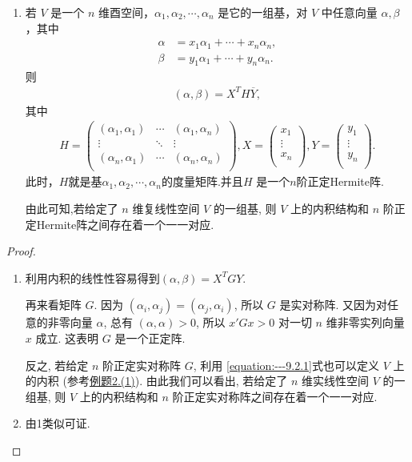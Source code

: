 \documentclass[../../main.tex]{subfiles}%
\begin{document}
\begin{theorem}
\begin{enumerate}
\item 若 \(V\) 是一个 \(n\) 维酉空间，\(\alpha_1,\alpha_2,\cdots,\alpha_n\) 是它的一组基，对 \(V\) 中任意向量 \(\alpha,\beta\)，其中
\begin{align*}
\alpha&=x_1\alpha_1+\cdots + x_n\alpha_n,\\
\beta&=y_1\alpha_1+\cdots + y_n\alpha_n.
\end{align*}
则
\begin{align*}
(\alpha,\beta)=X^TH\overline{Y},
\end{align*}
其中
\begin{align*}
H=\left( \begin{matrix}
\left( \alpha _1,\alpha _1 \right)&		\cdots&		\left( \alpha _1,\alpha _n \right)\\
\vdots&		\ddots&		\vdots\\
\left( \alpha _n,\alpha _1 \right)&		\cdots&		\left( \alpha _n,\alpha _n \right)\\
\end{matrix} \right) ,X=\left( \begin{array}{c}
x_1\\
\vdots\\
x_n\\
\end{array} \right) ,Y=\left( \begin{array}{c}
y_1\\
\vdots\\
y_n\\
\end{array} \right) .
\end{align*}
此时，$H$就是基\(\alpha_1,\alpha_2,\cdots,\alpha_n\)的度量矩阵.并且$H$ 是一个$n$阶正定Hermite阵.

由此可知,若给定了 $n$ 维复线性空间 $V$ 的一组基, 则 $V$ 上的内积结构和 $n$ 阶正定Hermite阵之间存在着一个一一对应. 
\end{enumerate} 
\end{theorem}
\begin{proof}
\begin{enumerate}
\item 利用内积的线性性容易得到$(\alpha,\beta)=X^TGY$.
 
再来看矩阵 $G$. 因为 $(\alpha_i, \alpha_j) = (\alpha_j, \alpha_i)$, 所以 $G$ 是实对称阵. 又因为对任意的非零向量 $\alpha$, 总有 $(\alpha, \alpha) > 0$, 所以 $x'Gx > 0$ 对一切 $n$ 维非零实列向量 $x$ 成立. 这表明 $G$ 是一个正定阵. 

反之, 若给定 $n$ 阶正定实对称阵 $G$, 利用 \eqref{equation:---9.2.1}式也可以定义 $V$ 上的内积 (参考\hyperref[example:一些常见的内积及内积空间]{例题2.(1)}). 由此我们可以看出, 若给定了 $n$ 维实线性空间 $V$ 的一组基, 则 $V$ 上的内积结构和 $n$ 阶正定实对称阵之间存在着一个一一对应. 

\item 由1类似可证.
\end{enumerate}
\end{proof}
\end{document}
